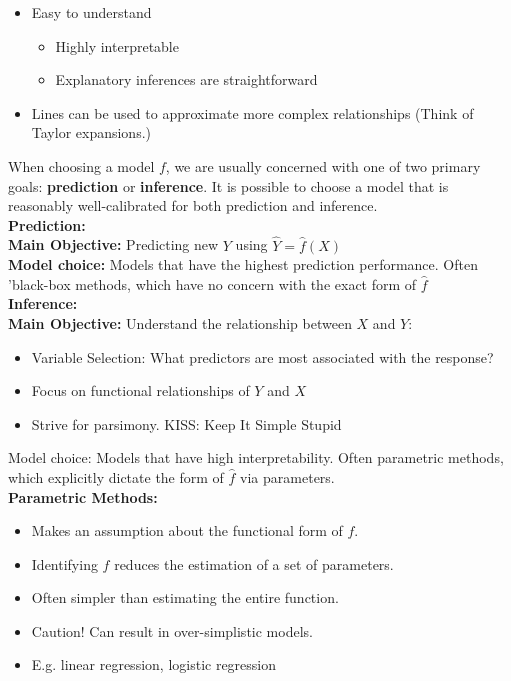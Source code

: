 \documentclass{article}
\begin{document}
\begin{itemize}
    \item Easy to understand
    \begin{itemize}
        \item Highly interpretable
        \item Explanatory inferences are straightforward
    \end{itemize}
    \item Lines can be used to approximate more complex relationships (Think of Taylor expansions.)
\end{itemize}
When choosing a model $f$, we are usually concerned with one of two primary goals: \textbf{prediction} or \textbf{inference}. It is possible to choose a model that is reasonably well-calibrated for both prediction and inference.\\

\textbf{Prediction:}\\
\textbf{Main Objective:} Predicting new $Y$ using $\hat{Y} = \hat{f}(X)$\\
\textbf{Model choice:} Models that have the highest prediction performance. Often 'black-box methods, which have no concern with the exact form of $\hat{f}$\\

\textbf{Inference:}\\
\textbf{Main Objective:} Understand the relationship between $X$ and $Y$:
\begin{itemize}
    \item Variable Selection: What predictors are most associated with the response?
    \item Focus on functional relationships of $Y$ and $X$
    \item Strive for parsimony. KISS: Keep It Simple Stupid
\end{itemize}
Model choice: Models that have high interpretability. Often parametric methods, which explicitly dictate the form of $\hat{f}$ via parameters.\\


\textbf{Parametric Methods:}
\begin{itemize}
    \item Makes an assumption about the functional form of $f$.
    \item Identifying $f$ reduces the estimation of a set of parameters.
    \item Often simpler than estimating the entire function.
    \item Caution! Can result in over-simplistic models.
    \item E.g. linear regression, logistic regression\\
\end{itemize}
\end{document}
